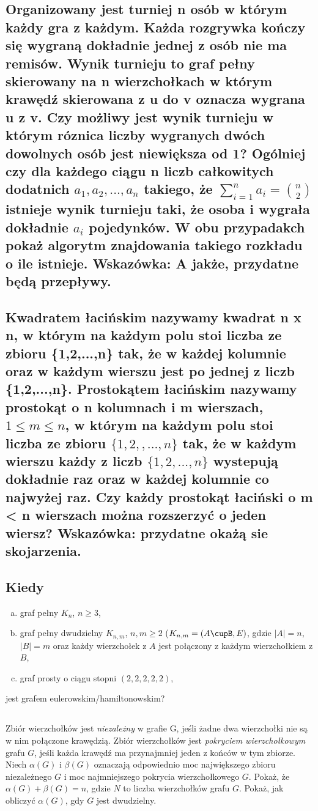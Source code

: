 \documentclass[12pt]{article}
\begin{document}
\subsection{Organizowany jest turniej n osób w którym każdy gra z każdym. Każda rozgrywka kończy się wygraną dokładnie jednej z osób nie ma remisów. Wynik turnieju to graf pełny skierowany na n wierzchołkach w którym krawędź skierowana z u do v oznacza wygrana u z v. Czy możliwy jest wynik turnieju w którym róznica liczby wygranych dwóch dowolnych osób jest niewiększa od 1? Ogólniej czy dla każdego ciągu n liczb całkowitych dodatnich $a_1,a_2,...,a_n$ takiego, że $\sum_{i=1}^{n} a_i = {n \choose 2}$ istnieje wynik turnieju taki, że osoba i wygrała dokładnie $a_i$ pojedynków. W obu przypadakch pokaż algorytm znajdowania takiego rozkładu o ile istnieje. Wskazówka: A jakże, przydatne będą przepływy. }

\subsection{Kwadratem łacińskim nazywamy kwadrat n x n, w którym na każdym polu stoi liczba ze zbioru \{1,2,...,n\} tak, że w każdej kolumnie oraz w każdym wierszu jest po jednej z liczb \{1,2,...,n\}. Prostokątem łacińskim nazywamy prostokąt o n kolumnach i m wierszach, $1 \leq m \leq n$, w którym na każdym polu stoi liczba ze zbioru $\{1,2,,...,n\}$ tak, że w każdym wierszu każdy z liczb $\{1,2,...,n\}$ wystepują dokładnie raz oraz w każdej kolumnie co najwyżej raz. Czy każdy prostokąt łaciński o m < n wierszach można rozszerzyć o jeden wiersz? Wskazówka: przydatne okażą sie skojarzenia.}

\newpage

\subsection{Kiedy}
\begin{enumerate}[(a)]
    \item graf pełny $K_n$, $n\geq 3$,
    \item graf pełny dwudzielny $K_{n,m}$, $n,m\geq 2$ ($K_{n,m}=(A\cupB,E)$, gdzie $|A|=n$, $|B|=m$ oraz każdy wierzchołek z $A$ jest połączony z każdym wierzchołkiem z $B$,
    \item graf prosty o ciągu stopni $(2,2,2,2,2)$,
\end{enumerate}

jest grafem eulerowskim/hamiltonowskim?

\subsection{}Zbiór wierzchołków jest \emph{niezależny} w grafie G, jeśli żadne dwa wierzchołki nie są w nim połączone krawędzią. Zbiór wierzchołków jest \emph{pokryciem wierzchołkowym} grafu $G$, jeśli każda krawędź ma przynajmniej jeden z końców w tym zbiorze. Niech $\alpha(G)$ i $\beta(G)$ oznaczają odpowiednio moc największego zbioru niezależnego $G$ i moc najmniejszego pokrycia wierzchołkowego $G$. Pokaż, że $\alpha(G)+\beta(G)=n$, gdzie $N$ to liczba wierzchołków grafu $G$. Pokaż, jak obliczyć $\alpha(G)$, gdy $G$ jest dwudzielny.
\end{document}
